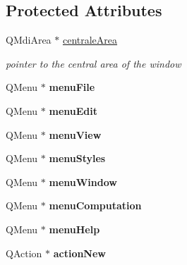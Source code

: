 \subsection*{\-Protected \-Attributes}
\begin{DoxyCompactItemize}
\item 
\hypertarget{class_main_window_af5df9378db57a148236d639dd928d08f}{\-Q\-Mdi\-Area $\ast$ \hyperlink{class_main_window_af5df9378db57a148236d639dd928d08f}{centrale\-Area}}\label{class_main_window_af5df9378db57a148236d639dd928d08f}

\begin{DoxyCompactList}\small\item\em pointer to the central area of the window \end{DoxyCompactList}\item 
\hypertarget{class_main_window_a2ca04227e7d71b036ccd0ed4176a5561}{\-Q\-Menu $\ast$ {\bfseries menu\-File}}\label{class_main_window_a2ca04227e7d71b036ccd0ed4176a5561}

\item 
\hypertarget{class_main_window_a51ec7fcfcb60073b395dee46daacf1f9}{\-Q\-Menu $\ast$ {\bfseries menu\-Edit}}\label{class_main_window_a51ec7fcfcb60073b395dee46daacf1f9}

\item 
\hypertarget{class_main_window_a57793b17cc2b8de42b5b10e9458ae9cb}{\-Q\-Menu $\ast$ {\bfseries menu\-View}}\label{class_main_window_a57793b17cc2b8de42b5b10e9458ae9cb}

\item 
\hypertarget{class_main_window_a559074b0cbdcb3183a201b105cc81610}{\-Q\-Menu $\ast$ {\bfseries menu\-Styles}}\label{class_main_window_a559074b0cbdcb3183a201b105cc81610}

\item 
\hypertarget{class_main_window_a2ddd0dbbad4b426293bc9480075b8a56}{\-Q\-Menu $\ast$ {\bfseries menu\-Window}}\label{class_main_window_a2ddd0dbbad4b426293bc9480075b8a56}

\item 
\hypertarget{class_main_window_a8142152915924723cee2f22e0868a852}{\-Q\-Menu $\ast$ {\bfseries menu\-Computation}}\label{class_main_window_a8142152915924723cee2f22e0868a852}

\item 
\hypertarget{class_main_window_a81d80bba8e8a31cea2bb218094890c81}{\-Q\-Menu $\ast$ {\bfseries menu\-Help}}\label{class_main_window_a81d80bba8e8a31cea2bb218094890c81}

\item 
\hypertarget{class_main_window_afcc4de380e40fe4aeb61b07402f00f58}{\-Q\-Action $\ast$ {\bfseries action\-New}}\label{class_main_window_afcc4de380e40fe4aeb61b07402f00f58}


\end{DoxyCompactItemize}
